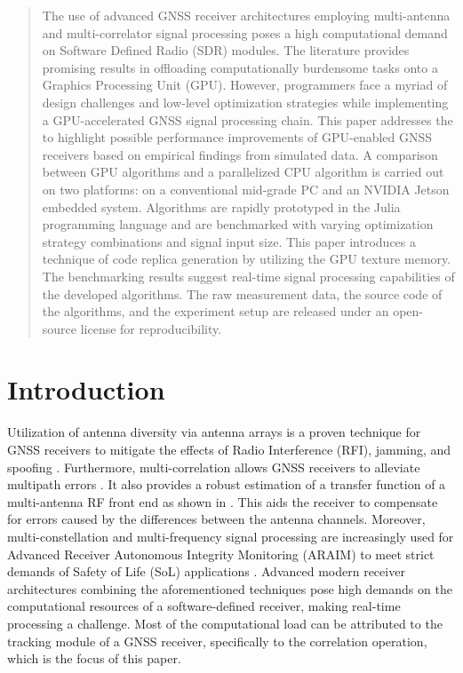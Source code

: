 \documentclass{juliacon}
\begin{document}


\maketitle

\begin{abstract}

    The use of advanced GNSS receiver architectures employing multi-antenna and multi-correlator signal processing poses a high
    computational demand on Software Defined Radio (SDR) modules. The literature provides promising results in offloading
    computationally burdensome tasks onto a Graphics Processing Unit (GPU). However, programmers face a myriad of design
    challenges and low-level optimization strategies while implementing a GPU-accelerated GNSS signal processing chain. This
    paper addresses the to highlight possible performance improvements of GPU-enabled GNSS receivers based on empirical findings from simulated data. A comparison between GPU algorithms and a parallelized CPU algorithm is carried out on two
    platforms: on a conventional mid-grade PC and an NVIDIA Jetson embedded system. Algorithms are rapidly prototyped in the Julia programming language and are benchmarked with varying optimization strategy combinations and signal input size. This paper introduces a technique of code replica
    generation by utilizing the GPU texture memory. The benchmarking results suggest real-time signal processing capabilities of the developed algorithms. The raw measurement data, the source code of the algorithms, and the experiment setup are released under an open-source license for reproducibility.

\end{abstract}

\section{Introduction}\label{sec:introduction}

Utilization of antenna diversity via antenna arrays is a proven technique for GNSS receivers to mitigate the effects of Radio Interference (RFI), jamming, and spoofing \cite{Moelker96}. Furthermore, multi-correlation allows GNSS receivers to alleviate multipath errors \cite{Nee1992}. It also provides a robust estimation of a transfer function of a multi-antenna RF front end as shown in \cite{Niestroj2018}. This aids the receiver to compensate for errors caused by the differences between the antenna channels. Moreover, multi-constellation and multi-frequency signal processing are increasingly used for Advanced Receiver Autonomous Integrity Monitoring (ARAIM) to meet strict demands of Safety of Life (SoL) applications \cite{Blanch2013}. Advanced modern receiver architectures combining the aforementioned techniques pose high demands on the computational resources of a software-defined receiver, making real-time processing a challenge. Most of the computational load can be attributed to the tracking module of a GNSS receiver, specifically to the correlation operation, which is the focus of this paper. 
\end{document}
